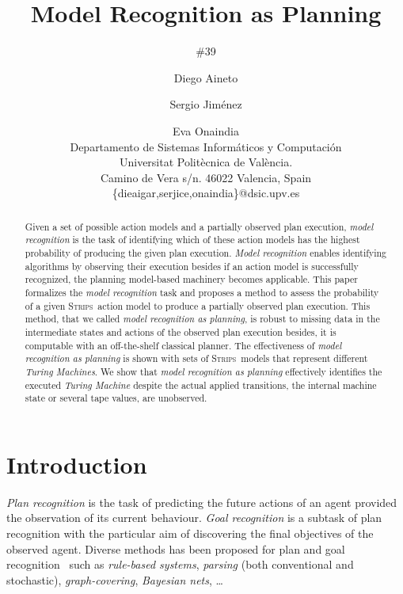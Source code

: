 \documentclass[letterpaper]{article} %
\newcommand{\strips}{\textsc{Strips}}     %
\begin{document}
\title{Model Recognition as Planning}
\author{\#39}


\author{Diego Aineto\and Sergio Jim\'enez\and Eva Onaindia\\
{\small Departamento de Sistemas Inform\'aticos y Computaci\'on}\\
{\small Universitat Polit\`ecnica de Val\`encia.}\\
{\small Camino de Vera s/n. 46022 Valencia, Spain}\\
{\small \{dieaigar,serjice,onaindia\}@dsic.upv.es}}

\maketitle
\begin{abstract} 
Given a set of possible action models and a partially observed plan execution, {\em model recognition} is the task of identifying which of these action models has the highest probability of producing the given plan execution. {\em Model recognition} enables identifying algorithms by observing their execution besides if an action model is successfully recognized, the planning model-based machinery becomes applicable. This paper formalizes the {\em model recognition} task and proposes a method to assess the probability of a given \strips\ action model to produce a partially observed plan execution. This method, that we called {\em model recognition as planning}, is robust to missing data in the intermediate states and actions of the observed plan execution besides, it is computable with an off-the-shelf classical planner. The effectiveness of {\em model recognition as planning} is shown with sets of \strips\ models that represent different {\em Turing Machines}. We show that {\em model recognition as planning} effectively identifies the executed {\em Turing Machine} despite the actual applied transitions, the internal machine state or several tape values, are unobserved.
\end{abstract}


\section{Introduction}
\label{sec:introduction}
{\em Plan recognition} is the task of predicting the future actions of an agent provided the observation of its current behaviour. {\em Goal recognition} is a subtask of plan recognition with the particular aim of discovering the final objectives of the observed agent. Diverse methods has been proposed for plan and goal recognition~\cite{carberry2001techniques} such as {\em rule-based systems},  {\em parsing}  (both  conventional and stochastic), {\em graph-covering}, {\em Bayesian nets}, \ldots
\end{document}
